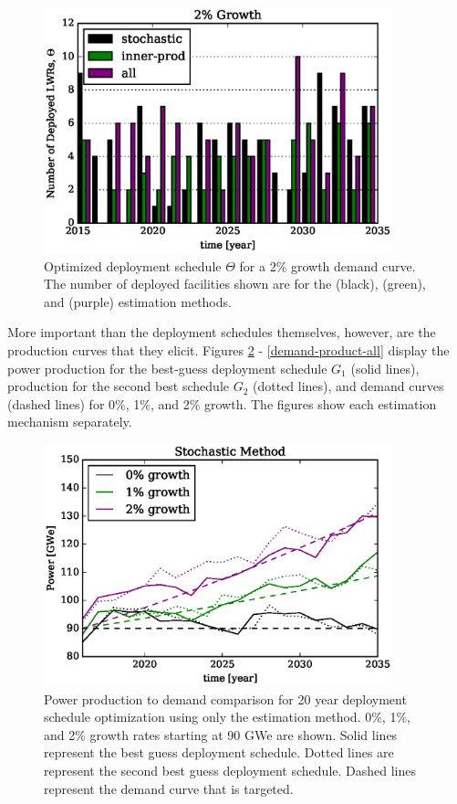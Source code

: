 \begin{figure}[htb]
\centering
\includegraphics[width=0.9\textwidth]{deploy-2.eps}
\caption{Optimized deployment schedule $\Theta$ for a 2\% growth 
demand curve. The number of deployed facilities shown are 
for the \stochastic (black), \innerprod (green), and \allflag (purple)
estimation methods.}
\label{deploy-2}
\end{figure}

\clearpage

More important than the deployment schedules themselves, however, are the
production curves that they elicit.
Figures \ref{demand-product-stochastic} - 
\ref{demand-product-all} display the
power production for the best-guess deployment schedule $G_1$ (solid lines),
production for the second best schedule $G_2$ (dotted lines), 
and demand curves (dashed lines) for 0\%, 1\%, and 2\% growth. 
The figures show each estimation mechanism separately.

\begin{figure}[htb]
\centering
\includegraphics[width=0.9\textwidth]{demand-product-stochastic.eps}
\caption{Power production to demand comparison for 20 year deployment 
schedule optimization using only the \stochastic estimation method.
0\%, 1\%, and 2\% growth rates starting at 90 GWe are shown. Solid lines 
represent the best guess deployment schedule.  Dotted lines are represent 
the second best guess deployment schedule. Dashed lines represent the 
demand curve that is targeted.
}
\label{demand-product-stochastic}
\end{figure}

